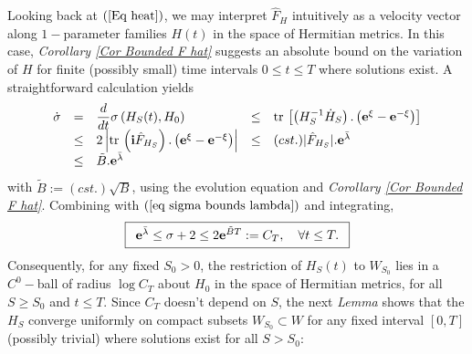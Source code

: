 \documentclass{article}
\newcommand{\func}[1]{\textnormal {#1\,}}
\newcommand{\e}[1]{\mathbf{e}^{#1}}
\begin{document}
Looking back at $\left( \ref{Eq heat}\right) $, we may interpret $\hat{F}%
_{H} $ intuitively as a velocity vector along $1-$parameter families $%
H\left( t\right) $ in the space of Hermitian metrics. In this case, \emph{%
Corollary \ref{Cor Bounded F hat}} suggests an absolute bound on the
variation of $H$ for finite (possibly small) time intervals $0\leq t\leq T$ where solutions exist. A straightforward calculation yields
\begin{displaymath}
\begin{array}{cclcl}
        \dot{\sigma}&=&\displaystyle\frac{d}{dt}\sigma\left(H_S(t),H_0 \right)
        &\leq& \func{tr}\left[ \left( H_S^{-1}\dot{H}_S\right)
        .\left( \e{\xi}-\e{-\xi }\right) \right]\\
        &\leq& 2\left\vert \func{tr} \left( \mathbf{i}\hat{F}_{H_{S}}\right).
        \left( \e{\xi }-\e{-\xi }\right) \right\vert 
        &\leq& (cst.)\vert \hat{F}_{H_{S}}\vert.\e{\bar{\lambda}}\\
        &\leq &\tilde{B}.\e{\bar{\lambda}}&&\\
\end{array}
\end{displaymath}
with $\tilde{B}:=(cst.)\sqrt{B}$, using the evolution equation and \emph{Corollary \ref{Cor Bounded F hat}}.
Combining with $\left( \ref{eq sigma bounds lambda}\right) $ and integrating,%
\begin{equation}        \label{eq bound on sigma}
\fbox{$%
\begin{array}{c}
        \e{\bar{\lambda}}\leq \sigma 
        +2\leq 2\e{\tilde{B}T}:= C_{T},\quad \forall t\leq T. 
\end{array}%
$}  
\end{equation}%
Consequently, for any fixed $S_{0}>0$, the restriction of $H_{S}\left( t\right) $ to $W_{S_{0}}$ lies in a $C^{0}-$ball of radius $\log C_{T}$ about $H_{0}$ in the space of Hermitian metrics, for all $S\geq S_{0}$ and $t\leq T$. Since $C_{T}$ doesn't depend on $S$, the next \emph{Lemma} shows that the $H_{S}$ converge uniformly on compact subsets $W_{S_{0}}\subset W$ for any fixed interval $\left[ 0,T\right] $ (possibly trivial) where solutions exist for all $S>S_{0}$:        
\newpage
\end{document}
